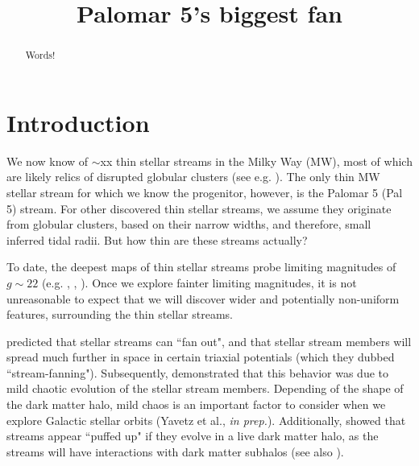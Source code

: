 \documentclass[modern]{aastex62}
\begin{document}
\sloppy\sloppypar\raggedbottom\frenchspacing %

\title{Palomar 5's biggest fan}



\begin{abstract}\noindent %
    Words!
\end{abstract}


\section{Introduction}
\label{sec:intro}
We now know of $\sim$xx thin stellar streams in the Milky Way (MW), most of which are likely relics of disrupted globular clusters (see e.g. \citealt{Ibata:2019}). The only thin MW stellar stream for which we know the progenitor, however, is the Palomar 5 (Pal 5) stream. For other discovered thin stellar streams, we assume they originate from globular clusters, based on their narrow widths, and therefore, small inferred tidal radii. But how thin are these streams actually? 

To date, the deepest maps of thin stellar streams probe limiting magnitudes of $g \sim 22$ (e.g. \citealt{Bernard:2016}, \citealt{Ibata:2016}, \citealt{deBoer:2018}). Once we explore fainter limiting magnitudes, it is not unreasonable to expect that we will discover wider and potentially non-uniform features, surrounding the thin stellar streams. 

\citet{Pearson:2015} predicted that stellar streams  can ``fan out", and that stellar stream members will spread much further in space in certain triaxial potentials (which they dubbed ``stream-fanning"). Subsequently, \citet{Price-Whelan:2016} demonstrated that this behavior was due to mild chaotic evolution of the stellar stream members. Depending of the shape of the dark matter halo, mild chaos is an important factor to consider when we explore Galactic stellar orbits (Yavetz et al., {\it in prep.}). Additionally, \citealt{Bonaca:2014} showed that streams  appear ``puffed up" if they evolve in a live dark matter halo, as the streams will have interactions with dark matter subhalos  (see also \citealt{Ibata:2002}). 
\end{document}
